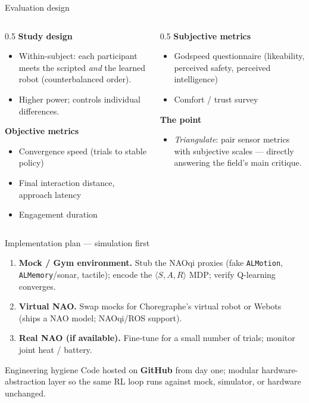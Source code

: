 \documentclass[aspectratio=169,10pt]{beamer}
\begin{document}
\begin{frame}{Evaluation design}
  \begin{columns}[T]
    \begin{column}{0.5\textwidth}
      \textbf{Study design}
      \begin{itemize}\footnotesize
        \item \alert{Within-subject}: each participant meets the scripted \emph{and} the learned robot (counterbalanced order).
        \item Higher power; controls individual differences.
      \end{itemize}
      \textbf{Objective metrics}
      \begin{itemize}\footnotesize
        \item Convergence speed (trials to stable policy)
        \item Final interaction distance, approach latency
        \item Engagement duration
      \end{itemize}
    \end{column}
    \begin{column}{0.5\textwidth}
      \textbf{Subjective metrics}
      \begin{itemize}\footnotesize
        \item \alert{Godspeed} questionnaire (likeability, perceived safety, perceived intelligence)
        \item Comfort / trust survey
      \end{itemize}
      \textbf{The point}
      \begin{itemize}\footnotesize
        \item \emph{Triangulate}: pair sensor metrics with subjective scales --- directly answering the field's main critique.
      \end{itemize}
    \end{column}
  \end{columns}
\end{frame}

\begin{frame}{Implementation plan --- simulation first}
  \begin{enumerate}
    \item \textbf{Mock / Gym environment.} Stub the NAOqi proxies (fake \texttt{ALMotion}, \texttt{ALMemory}/sonar, tactile); encode the $\langle S,A,R\rangle$ MDP; verify Q-learning converges.
    \item \textbf{Virtual NAO.} Swap mocks for Choregraphe's virtual robot or Webots (ships a NAO model; NAOqi/ROS support).
    \item \textbf{Real NAO (if available).} Fine-tune for a small number of trials; monitor joint heat / battery.
  \end{enumerate}
  \vspace{0.4em}
  \begin{block}{Engineering hygiene}
    \footnotesize Code hosted on \textbf{GitHub} from day one; modular hardware-abstraction layer so the same RL loop runs against mock, simulator, or hardware unchanged.
  \end{block}
\end{frame}
\end{document}
